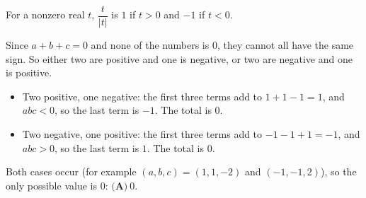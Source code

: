 For a nonzero real $t$, $\dfrac{t}{|t|}$ is $1$ if $t>0$ and $-1$ if $t<0$.

Since $a+b+c=0$ and none of the numbers is $0$, they cannot all have the same sign. So either two are positive and one is negative, or two are negative and one is positive.
\begin{itemize}
\item Two positive, one negative: the first three terms add to $1+1-1=1$, and $abc<0$, so the last term is $-1$. The total is $0$.
\item Two negative, one positive: the first three terms add to $-1-1+1=-1$, and $abc>0$, so the last term is $1$. The total is $0$.
\end{itemize}
Both cases occur (for example $(a,b,c)=(1,1,-2)$ and $(-1,-1,2)$), so the only possible value is $0$: $\boxed{\textbf{(A)}\ 0}$.
